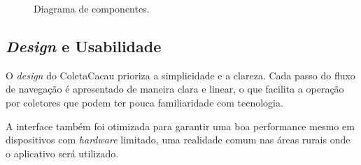 \begin{figure}[htb]
    \centering
    \caption{Diagrama de componentes.}
    \label{fig:ComponentsDiagram}
\end{figure}

\newpage

\subsection{\textit{Design} e Usabilidade}
O \textit{design} do ColetaCacau prioriza a simplicidade e a clareza. Cada passo do fluxo de navegação é apresentado de maneira clara e linear, o que facilita a operação por coletores que podem ter pouca familiaridade com tecnologia.

A interface também foi otimizada para garantir uma boa performance mesmo em dispositivos com \textit{hardware} limitado, uma realidade comum nas áreas rurais onde o aplicativo será utilizado.

